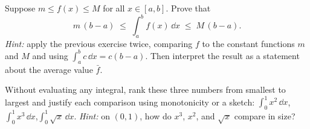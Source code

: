 \begin{exercise}
Suppose $m \le f(x) \le M$ for all $x \in [a,b]$. Prove that
\[
  m\,(b-a) \;\le\; \int_a^b f(x)\,\dd x \;\le\; M\,(b-a).
\]
\emph{Hint:} apply the previous exercise twice, comparing $f$ to the constant
functions $m$ and $M$ and using $\int_a^b c\,\dd x = c(b-a)$. Then interpret the
result as a statement about the average value $\bar f$.
\end{exercise}

\begin{exercise}
Without evaluating any integral, rank these three numbers from smallest to
largest and justify each comparison using monotonicity or a sketch:
$\int_0^1 x^2\,\dd x$,\quad $\int_0^1 x^3\,\dd x$,\quad $\int_0^1 \sqrt{x}\,\dd x$.
\emph{Hint:} on $(0,1)$, how do $x^3$, $x^2$, and $\sqrt{x}$ compare in size?
\end{exercise}
